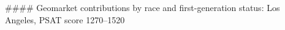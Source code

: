 #### Geomarket contributions by race and first-generation status: Los Angeles, PSAT score 1270–1520
